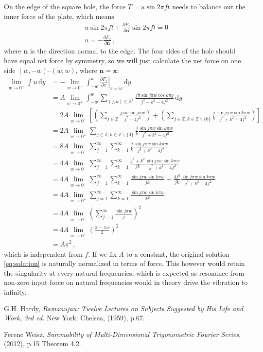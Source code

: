 \documentclass[]{article}
\newcommand{\ud}{\mathrm{d}}
\begin{document}
On the edge of the square hole, the force $T = u\sin 2\pi f t$ needs to balance out the inner force of the plate, which means
\begin{align*}
u\sin 2\pi f t + \frac{\partial F_f}{\partial \mathbf{n}} \sin 2\pi ft = 0\\
u = -\frac{\partial F_f}{\partial \mathbf{n}}\,,
\end{align*}
where $\mathbf{n}$ is the direction normal to the edge. The four sides of the hole should have equal net force by symmetry, so we will just calculate the net force on one side $(w, -w) \mbox{--}(w, w)$, where $
\mathbf{n} = \mathbf{x}$:
\begin{align*}
\lim_{w\to 0^+}\int u\,\ud y  &= -\lim_{w\to 0^+} \int_{-w}^w \left.\frac{\partial F_f}{\partial x}\right|_{x=w}\,\ud y\\
&= A \lim_{w\to 0^+} \int_{-w}^w \sum_{(j,k)\in\mathbb{Z}^2} \frac{j\pi\sin j\pi w \cos k\pi y}{j^2 + k^2 - 4f^2}\,\ud y\\
&= 2A \lim_{w\to 0^+} \left[\left( \sum_{j\in\mathbb{Z}} \frac{j\pi w\sin j\pi w}{j^2 - 4f^2}  \right) + \left(\sum_{j\in\mathbb{Z}, k\in\mathbb{Z}\backslash\{0\}} \frac{j}{k}\frac{\sin j\pi w \sin k\pi w}{j^2 + k^2 - 4f^2}\right)\right]\\
&= 2A \lim_{w\to 0^+}  \sum_{j\in\mathbb{Z}, k\in\mathbb{Z}\backslash\{0\}} \frac{j}{k}\frac{\sin j\pi w \sin k\pi w}{j^2 + k^2 - 4f^2}\\
&= 8A \lim_{w\to 0^+}  \sum_{j=1}^\infty\sum_{k=1}^\infty \frac{j}{k}\frac{\sin j\pi w \sin k\pi w}{j^2 + k^2 - 4f^2}\\
&= 4A \lim_{w\to 0^+}  \sum_{j=1}^\infty\sum_{k=1}^\infty \frac{j^2+k^2}{jk}\frac{\sin j\pi w \sin k\pi w}{j^2 + k^2 - 4f^2}\\
&= 4A \lim_{w\to 0^+}  \sum_{j=1}^\infty\sum_{k=1}^\infty \frac{\sin j\pi w \sin k\pi w}{jk} + \frac{4f^2}{jk}\frac{\sin j\pi w \sin k\pi w}{j^2 + k^2 - 4f^2}\\
&= 4A \lim_{w\to 0^+}  \sum_{j=1}^\infty\sum_{k=1}^\infty \frac{\sin j\pi w \sin k\pi w}{jk}\\
&= 4A \lim_{w\to 0^+} \left( \sum_{j=1}^\infty \frac{\sin j\pi w }{j}\right)^2\\
&= 4A \lim_{w\to 0^+} \left( \frac{\pi-\pi w}{2}\right)^2\\
&=A\pi^2\,,
\end{align*}
which is independent from $f$. If we fix $A$ to a constant, the original solution \eqref{eq:solution} is naturally normalized in terms of force. This however would retain the singularity at every natural frequencies, which is expected as resonance from non-zero input force on natural frequencies would in theory drive the vibration to infinity. 

\begin{thebibliography}{9}
G.H. Hardy, \textit{Ramanujan: Twelve Lectures on Subjects Suggested by His Life and Work, 3rd ed.} New York: Chelsea, (1959), p.67.

Ferenc Weisz, \textit{Summability of Multi-Dimensional Trigonometric Fourier Series}, (2012), p.15 Theorem 4.2.
\end{thebibliography}
\end{document}
